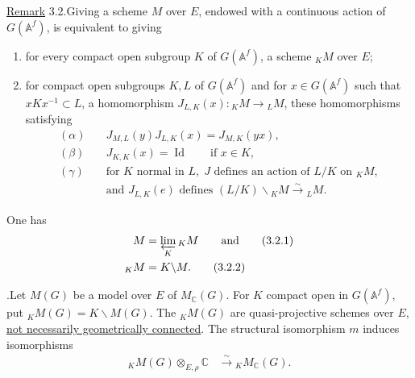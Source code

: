 \documentclass[10pt]{article}
\newcommand{\Af}{\mathbb A^f}
\newcommand{\C}{\mathbb C}
\newcommand{\id}{\operatorname{Id}}
\newcommand{\limproj}{\varprojlim}
\newcommand{\MC}{M_{\C}}
\begin{document}
\noindent\uline{Remark} 3.2.\quad Giving a scheme $M$ over $E$, endowed with a continuous action of $G(\Af)$, is equivalent to giving
\begin{enumerate}[label=(\alph*),leftmargin=2.4em]
\item for every compact open subgroup $K$ of $G(\Af)$, a scheme ${}_K M$ over $E$;
\item for compact open subgroups $K,L$ of $G(\Af)$ and for $x\in G(\Af)$ such that $xKx^{-1}\subset L$, a homomorphism $J_{L,K}(x):{}_K M\longrightarrow {}_L M$, these homomorphisms satisfying
\begin{align*}
(\alpha)\quad&J_{M,L}(y)J_{L,K}(x)=J_{M,K}(yx),\\
(\beta)\quad&J_{K,K}(x)=\id\qquad\text{if }x\in K,\\
(\gamma)\quad&\text{for }K\text{ normal in }L,\; J\text{ defines an action of }L/K\text{ on }{}_K M,\\
&\text{and }J_{L,K}(e)\text{ defines }(L/K)\backslash {}_K M\xrightarrow{\sim}{}_L M.
\end{align*}
\end{enumerate}
One has
\begingroup
\makeatletter
\tagsleft@true
\makeatother
\begin{align}
M&=\limproj_K {}_K M\qquad\text{and} \tag{3.2.1}\\
{}_K M&=K\backslash M. \tag{3.2.2}
\end{align}
\endgroup

.\quad Let $M(G)$ be a model over $E$ of $\MC(G)$. For $K$ compact open in $G(\Af)$, put ${}_K M(G)=K\backslash M(G)$. The ${}_K M(G)$ are quasi-projective schemes over $E$, \uline{not necessarily geometrically connected}. The structural isomorphism $m$ induces isomorphisms
\begingroup
\makeatletter
\tagsleft@true
\makeatother
\begin{align}
{}_K M(G)\otimes_{E,\rho}\C&\xrightarrow{\sim}{}_K\MC(G). \tag{3.3.1}
\end{align}
\endgroup
\end{document}
